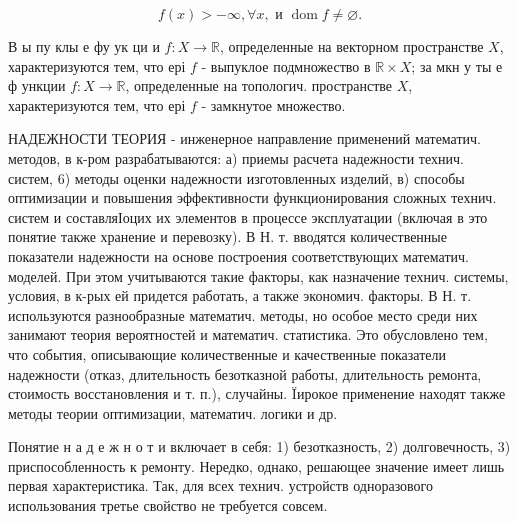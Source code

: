 \documentclass[10pt]{article}
\begin{document}
\[

f(x)>-\infty, \forall x, \text { и } \operatorname{dom} f \neq \varnothing .

\]



В ы пу клы е фу ук ци и $f: X \rightarrow \mathbb{R}$, определенные на векторном пространстве $X$, характеризуются тем, что ері $f$ - выпуклое подмножество в $\mathbb{R} \times X$; за мкн у ты е ф ункции $f: X \rightarrow \mathbb{R}$, определенные на топологич. пространстве $X$, характеризуются тем, что ері $f$ - замкнутое множество.



НАДЕЖНОСТИ ТЕОРИЯ - инженерное направление применений математич. методов, в к-ром разрабатываются: а) приемы расчета надежности технич. систем, 6) методы оценки надежности изготовленных изделий, в) способы оптимизации и повышения эффективности функционирования сложных технич. систем и составляІоцих их элементов в процессе эксплуатации (включая в это понятие также хранение и перевозку). В Н. т. вводятся количественные показатели надежности на основе построения соответствующих математич. моделей. При этом учитываются такие факторы, как назначение технич. системы, условия, в к-рых ей придется работать, а также экономич. факторы. В Н. т. используются разнообразные математич. методы, но особое место среди них занимают теория вероятностей и математич. статистика. Это обусловлено тем, что события, описывающие количественные и качественные показатели надежности (отказ, длительность безотказной работы, длительность ремонта, стоимость восстановления и т. п.), случайны. Ïирокое применение находят также методы теории оптимизации, математич. логики и др.



Понятие н а д е ж н о т и включает в себя: 1) безотказность, 2) долговечность, 3) приспособленность к ремонту. Нередко, однако, решающее значение имеет лишь первая характеристика. Так, для всех технич. устройств одноразового использования третье свойство не требуется совсем.
\end{document}
